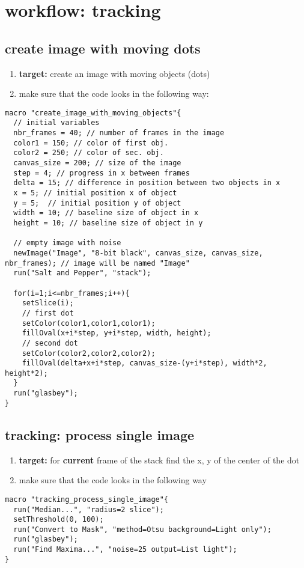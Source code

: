 \documentclass[11pt]{article}
\begin{document}
\section{workflow: tracking}
\label{sec-8}
\subsection{create image with moving dots}
\label{sec-8-1}
\begin{enumerate}
\item \textbf{target:} create an image with moving objects (dots)
\item make sure that the code looks in the following way:
\end{enumerate}
\begin{verbatim}
macro "create_image_with_moving_objects"{
  // initial variables
  nbr_frames = 40; // number of frames in the image
  color1 = 150; // color of first obj.
  color2 = 250; // color of sec. obj.
  canvas_size = 200; // size of the image
  step = 4; // progress in x between frames
  delta = 15; // difference in position between two objects in x
  x = 5; // initial position x of object
  y = 5;  // initial position y of object
  width = 10; // baseline size of object in x
  height = 10; // baseline size of object in y

  // empty image with noise
  newImage("Image", "8-bit black", canvas_size, canvas_size, nbr_frames); // image will be named "Image"
  run("Salt and Pepper", "stack");

  for(i=1;i<=nbr_frames;i++){
	setSlice(i);
	// first dot
	setColor(color1,color1,color1);
	fillOval(x+i*step, y+i*step, width, height);
	// second dot
	setColor(color2,color2,color2);
	fillOval(delta+x+i*step, canvas_size-(y+i*step), width*2, height*2);
  }
  run("glasbey");
}
\end{verbatim}

\subsection{tracking: process single image}
\label{sec-8-2}
\begin{enumerate}
\item \textbf{target:} for \textbf{current} frame of the stack find the x, y of the
center of the dot
\item make sure that the code looks in the following way
\end{enumerate}
\begin{verbatim}
macro "tracking_process_single_image"{
  run("Median...", "radius=2 slice");
  setThreshold(0, 100);
  run("Convert to Mask", "method=Otsu background=Light only");
  run("glasbey");
  run("Find Maxima...", "noise=25 output=List light");
}
\end{verbatim}
\end{document}
